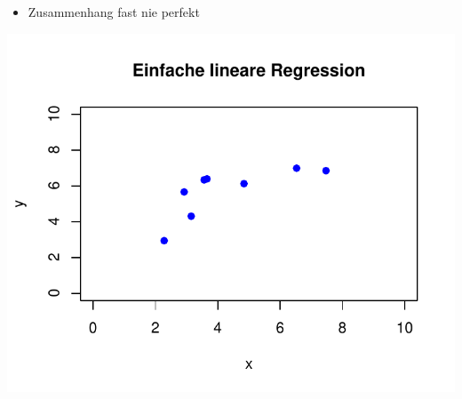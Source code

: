 \documentclass[aspectratio=169, journal, x11names, unknownkeysallowed, hyperref={colorlinks,
linkcolor = SS2,
urlcolor  = F3,
citecolor = F3,
anchorcolor = A4}, 12pt]{beamer}
\begin{document}
    \begin{frame}[t]
      \begin{minipage}[t]{0.45\textwidth}
        \vspace{-11.5em}
        \begin{itemize}
          \item Zusammenhang fast nie perfekt
        \end{itemize}
    \end{minipage}%
    \begin{minipage}[t]{0.45\textwidth}
      \centering
      \includegraphics[scale=0.5]{../Plots/reg_lin_2.pdf}
    \end{minipage}
  \end{frame}
\end{document}
